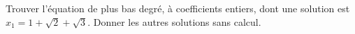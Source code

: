 Trouver l'équation de plus bas degré, à coefficients entiers, dont une solution est $x_1 = 1 + \sqrt{2} + \sqrt{3}$. Donner les autres solutions sans calcul.
